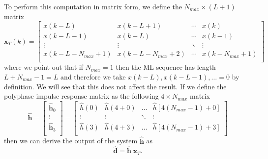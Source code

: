 \documentclass[10pt]{article}
\begin{document}
To perform this computation in matrix form, we define the $N_{max} \times (L+1)$ matrix
\begin{equation}
\mathbf{x}_T(k) =
 \begin{bmatrix}
  x(k-L) & x(k-L+1) & \cdots & x(k) \\
  x(k-L-1) & x(k-L) & \cdots & x(k-1) \\
  \vdots  & \vdots  & \ddots & \vdots  \\
  x(k-L-N_{max}+1) & x(k-L-N_{max}+2) & \cdots & x(k-N_{max}+1) \\
 \end{bmatrix}
\end{equation}
where we point out that if $N_{max} = 1$ then the ML sequence has length $L+N_{max}-1 = L$ and therefore we take $x(k-L), x(k-L-1), \ldots = 0$ by definition. We will see that this does not affect the result. If we define the polyphase impulse response matrix as the following $4\times N_{max}$ matrix
\begin{equation}
\mathbf{\hat{h}} =
 \begin{bmatrix}
  \mathbf{\hat{h}}_0 \\
  \vdots  \\
  \mathbf{\hat{h}}_3 \\
 \end{bmatrix} =
 \begin{bmatrix}
  \hat{h}(0) & \hat{h}(4+0) & \ldots & \hat{h}\left[4(N_{max}-1) + 0\right] \\
  \vdots  & \vdots  & \ddots & \vdots  \\
  \hat{h}(3) & \hat{h}(4+3) & \ldots & \hat{h}\left[4(N_{max}-1) + 3\right]\\
 \end{bmatrix}
\end{equation}
then we can derive the output of the system $\hat{\mathbf{h}}$ as
\begin{equation}
	\hat{\mathbf{d}} = \hat{\mathbf{h}} \; \mathbf{x}_T.
\end{equation}
\end{document}
